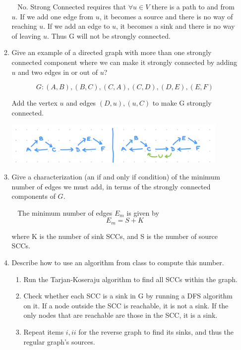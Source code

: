\documentclass[12pt, letterpaper]{article}
\begin{document}
\begin{enumerate}
\begin{enumerate}
\-\ \newline
No. Strong Connected requires that \(\forall u \in V\) there is a path to and from \(u\). If we add one edge from \(u\), it becomes a source and there is no way of reaching \(u\). If we add an edge to \(u\), it becomes a sink and there is no way of leaving \(u\). Thus G will not be strongly connected. 
\-\ \newline

\item Give an example of a directed graph with more than one strongly connected component where we can make it strongly connected by adding $u$ and two edges
in or out of $u$?

\[
G: (A, B), (B, C), (C, A), (C, D), (D, E), (E, F)
\]

Add the vertex \(u\) and edges \( (D, u), (u, C) \) to make G strongly connected. 

\includegraphics[width=0.9\textwidth]{src/CSE101 hw2 q3.png}


\item Give a characterization (an if and only if condition) of the minimum number of edges we must add,
in terms of the strongly connected components of $G$.

\-\ \newline 
The minimum number of edges \(E_m\) is given by
\[
E_m = S + K
\]

where K is the number of sink SCCs, and S is the number of source SCCs.
\-\ \newline

\item Describe how to use an algorithm from class to compute this number.

\begin {enumerate}
\item Run the Tarjan-Koseraju algorithm to find all SCCs within the graph. 
\item Check whether each SCC is a sink in G by running a DFS algorithm on it. If a node outside the SCC is reachable, it is not a sink. If the only nodes that are reachable are those in the SCC, it is a sink.
\item Repeat items \(i, ii\) for the reverse graph to find its sinks, and thus the regular graph's sources. 


\end{enumerate}
\end{enumerate}
\end{enumerate}
\end{document}
